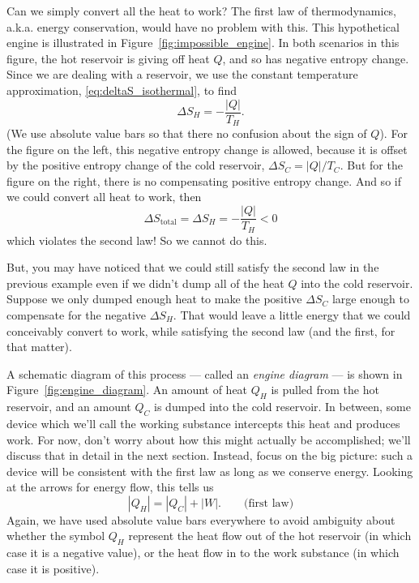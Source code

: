 Can we simply convert all the heat to work?  The first law of
thermodynamics, a.k.a. energy conservation, would have no problem with
this.  This hypothetical engine is illustrated in
Figure~\ref{fig:impossible_engine}.  In both scenarios in this figure,
the hot reservoir is giving off heat $Q$, and so has negative entropy
change.  Since we are dealing with a reservoir, we use the 
constant temperature approximation, \eqref{eq:deltaS_isothermal}, to find
\begin{equation}
\Delta S_H = -\frac{|Q|}{T_H}.
\end{equation}
(We use absolute value bars so that there no confusion about the sign
of $Q$).  For the figure on the left, this negative entropy change is
allowed, because it is offset by the positive entropy change of the
cold reservoir, $\Delta S_C=|Q|/T_C$.  But for the figure on the
right, there is no compensating positive entropy change.  And so if we
could convert all heat to work, then
\begin{equation}
\Delta S_\text{total} = \Delta S_H = -\frac{|Q|}{T_H} < 0
\end{equation}
which violates the second law!  So we cannot do this.

But, you may have noticed that we could still satisfy the second law in
the previous example even if we didn't dump all of the heat $Q$ into the
cold reservoir.  Suppose we only dumped enough heat to make the positive
$\Delta S_C$ large enough to compensate for the negative $\Delta S_H$.
That would leave a little energy that we could conceivably convert to
work, while satisfying the second law (and the first, for that matter).

A schematic diagram of this process --- called an \textit{engine diagram}
--- is shown in Figure~\ref{fig:engine_diagram}.  An amount of heat
$Q_H$ is pulled from the hot reservoir, and an amount $Q_C$ is dumped
into the cold reservoir.  In between, some device which we'll call the
working substance intercepts this heat and produces work.  For now,
don't worry about how this might actually be accomplished; we'll
discuss that in detail in the next section.  Instead, focus on the big
picture: such a device will be consistent with the first law as long
as we conserve energy.  Looking at the arrows for energy flow, this
tells us
\begin{equation}
|Q_H| = |Q_C| + |W|. \qquad\text{(first law)}
\end{equation}
Again, we have used absolute value bars everywhere to avoid ambiguity about
whether the symbol $Q_H$ represent the heat flow out of the hot
reservoir (in which case it is a negative value), or the heat flow in
to the work substance (in which case it is positive). 

